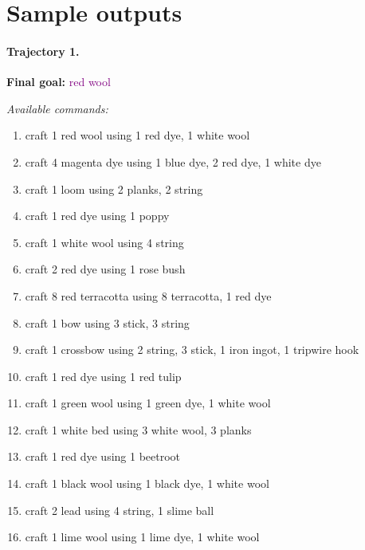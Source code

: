 

\newpage
\section[appx]{Sample outputs}
\label{appx:sample_output}
\paragraph{Trajectory 1.}
\textbf{Final goal:} \textcolor{purple}{red wool}

\textit{Available commands:}
\begin{enumerate}[leftmargin=2em]
    \item craft 1 red wool using 1 red dye, 1 white wool
    \item craft 4 magenta dye using 1 blue dye, 2 red dye, 1 white dye
    \item craft 1 loom using 2 planks, 2 string
    \item craft 1 red dye using 1 poppy
    \item craft 1 white wool using 4 string
    \item craft 2 red dye using 1 rose bush
    \item craft 8 red terracotta using 8 terracotta, 1 red dye
    \item craft 1 bow using 3 stick, 3 string
    \item craft 1 crossbow using 2 string, 3 stick, 1 iron ingot, 1 tripwire hook
    \item craft 1 red dye using 1 red tulip
    \item craft 1 green wool using 1 green dye, 1 white wool
    \item craft 1 white bed using 3 white wool, 3 planks
    \item craft 1 red dye using 1 beetroot
    \item craft 1 black wool using 1 black dye, 1 white wool
    \item craft 2 lead using 4 string, 1 slime ball
    \item craft 1 lime wool using 1 lime dye, 1 white wool
\end{enumerate}

